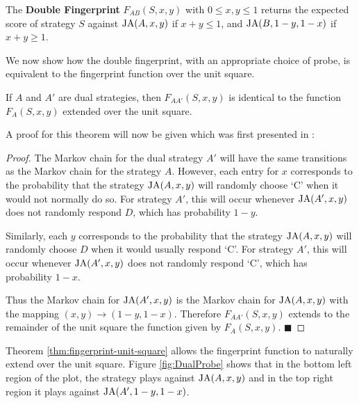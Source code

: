 
\begin{definition}\label{def:double-fingerprint}
The \textbf{Double Fingerprint} $F_{AB}(S, x, y)$ with $0 \leq x, y \leq 1$ returns the expected score of strategy $S$ against $\text{JA}(A, x, y)$ if $x+y \leq 1$, and $\text{JA}(B, 1-y, 1-x)$ if $x+y \geq 1$.
\end{definition}

We now show how the double fingerprint, with an appropriate choice of probe, is equivalent to the fingerprint function over the unit square.

\begin{theorem}\label{thm:fingerprint-unit-square}
If $A$ and $A'$ are dual strategies, then $F_{AA'}(S, x, y)$ is identical to the function $F_A(S, x, y)$ extended over the unit square.
\end{theorem}

A proof for this theorem will now be given which was first presented in \cite{Ashlock2004}:
\begin{proof}\label{prf:fingerprint-unit-square}
The Markov chain for the dual strategy $A'$ will have the same transitions as the Markov chain for the strategy $A$.
However, each entry for $x$ corresponds to the probability that the strategy $\text{JA}(A, x, y)$ will randomly choose `C' when it would not normally do so.
For strategy $A'$, this will occur whenever $\text{JA}(A', x, y)$ does not randomly respond $D$, which has probability $1 - y$.

Similarly, each $y$ corresponds to the probability that the strategy $\text{JA}(A, x, y)$ will randomly choose $D$ when it would usually respond `C'.
For strategy $A'$, this will occur whenever $\text{JA}(A', x, y)$ does not randomly respond `C', which has probability $1 - x$.

Thus the Markov chain for $\text{JA}(A', x, y)$ is the Markov chain for $\text{JA}(A, x, y)$ with the mapping $(x, y) \rightarrow (1-y, 1-x)$.
Therefore $F_{AA'}(S, x, y)$ extends to the remainder of the unit square the function given by $F_A(S, x, y)$. $\blacksquare$
\end{proof}

Theorem \ref{thm:fingerprint-unit-square} allows the fingerprint function to naturally extend over the unit square.
Figure \ref{fig:DualProbe} shows that in the \textcolor{sol-violet}{bottom left} region of the plot, the strategy plays against $\text{JA}(A, x, y)$ and in the \textcolor{sol-cyan}{top right} region it plays against $\text{JA}(A', 1-y, 1-x)$.

